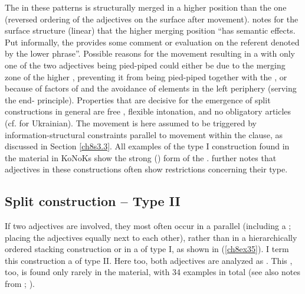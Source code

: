 \documentclass[output=paper,colorlinks,citecolor=brown]{langscibook}
\begin{document}
The   in these patterns is structurally merged in a
higher position than the  one (reversed ordering of the
adjectives on the surface after movement). \citet[12]{Pfaff2019} notes for
the surface structure (linear)   that the higher
merging position ``has semantic effects. Put informally, the 
provides some comment or evaluation on the referent denoted by the lower
 phrase''. Possible reasons for the movement resulting in a 
with only one of the two adjectives being pied-piped could either be
due to the merging zone of the higher , preventing it from
being pied-piped together with the , or because of factors of
 and the avoidance of  elements in the left
periphery (serving the end- principle). Properties that are
decisive for the emergence of split constructions in general are free
, flexible intonation, and no obligatory articles (cf. \citealp{FéryPaslawskaFanselow2007} for Ukrainian). The  movement is here assumed to be
triggered by information-structural constraints parallel to movement
within the clause, as discussed in Section \ref{ch8s3.3}. All examples of the type I
construction found in the  material in KoNoKs show the strong
() form of the . \citet[16]{Bech17} further notes that
adjectives in these constructions often show restrictions concerning
their type.

\subsection{Split construction – Type II}\label{ch8s4.2}
If two adjectives are involved, they most often occur in a parallel
 (including a ; placing the adjectives
equally next to each other), rather than in a hierarchically ordered
stacking construction or in a  of type I, as shown
in (\ref{ch8ex35}). I term this construction a  of type II. Here too, both adjectives are analyzed as . This , too, is
found only rarely in the  material, with 34 examples in total (see
also notes from \citealp[57--60]{Ringdal1918}; \citealp[72]{Faarlund04}).
\end{document}
